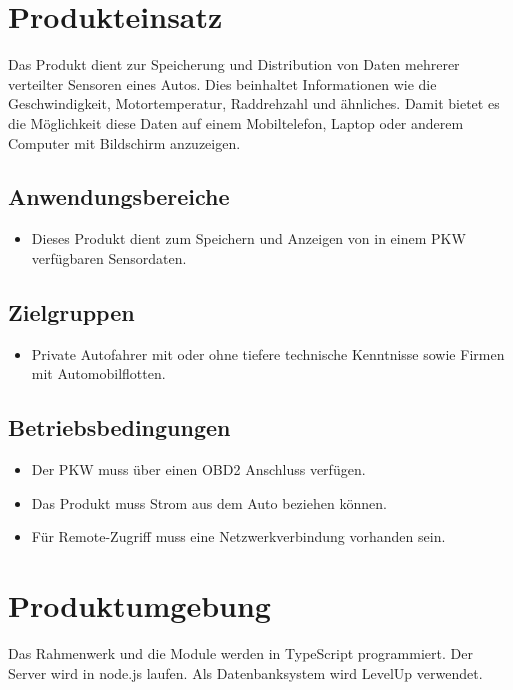 \documentclass[pflichtenheft.tex]{subfiles}
\begin{document}
\chapter{Produkteinsatz}
Das Produkt dient zur Speicherung und Distribution von Daten mehrerer verteilter Sensoren eines Autos. Dies beinhaltet Informationen wie die Geschwindigkeit, Motortemperatur, Raddrehzahl und ähnliches. Damit bietet es die Möglichkeit diese Daten  auf einem Mobiltelefon, Laptop oder anderem Computer mit Bildschirm anzuzeigen.


\section{Anwendungsbereiche}
\begin{itemize}
\item
Dieses Produkt dient zum Speichern und Anzeigen von in einem PKW verfügbaren Sensordaten.
\end{itemize}


\section{Zielgruppen}
\begin{itemize}
\item
Private Autofahrer mit oder ohne tiefere technische Kenntnisse sowie Firmen mit Automobilflotten. 
\end{itemize}


\section{Betriebsbedingungen}
\begin{itemize}
\item
Der PKW muss über einen OBD2 Anschluss verfügen.
\item
Das Produkt muss Strom aus dem Auto beziehen können.
\item
Für Remote-Zugriff muss eine Netzwerkverbindung vorhanden sein.
\end{itemize}


\chapter{Produktumgebung}
Das Rahmenwerk und die Module werden in TypeScript programmiert. Der Server wird in node.js laufen. Als Datenbanksystem wird LevelUp verwendet.
\end{document}
